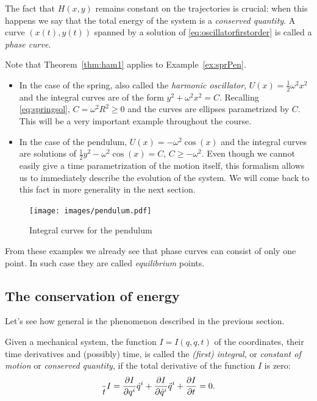 \documentclass[english,fontsize=11pt,paper=a5,oneside]{scrbook}
\let\d\relax
\DeclareMathOperator{\d}{d}
\theoremstyle{definition}
\newenvironment{example}
  {\pushQED{\qed}\renewcommand{\qedsymbol}{$\lozenge$}\examplex}
  {\popQED\endexamplex}
\begin{document}
The fact that $H(x,y)$ remains constant on the trajectories is crucial: when this happens we say that the total energy of the system is a \emph{conserved quantity}.
A curve $(x(t), y(t))$ spanned by a solution of \eqref{eq:oscillatorfirstorder} is called a \emph{phase curve}.

\begin{example}
Note that Theorem~\ref{thm:ham1} applies to Example~\ref{ex:sprPen}.
\begin{itemize}
    \item In the case of the spring, also called the \emph{harmonic oscillator}, $U(x) = \frac12 \omega^2 x^2$ and the integral curves are of the form $y^2 + \omega^2 x^2 = C$.
    Recalling \eqref{eq:springsol}, $C = \omega^2 R^2 \geq 0$ and the curves are ellipses parametrized by $C$. 
    This will be a very important example throughout the course.
    \item In the case of the pendulum, $U(x) = -\omega^2 \cos(x)$ and the integral curves are solutions of $\frac12 y^2 - \omega^2 \cos(x) = C$, $C \geq -\omega^2$.
    Even though we cannot easily give a time parametrization of the motion itself, this formalism allows us to immediately describe the evolution of the system.
    We will come back to this fact in more generality in the next section.
\end{itemize}
\end{example}

\begin{figure}[ht]
    \centering
    \texttt{[image: images/pendulum.pdf]}
    \caption{Integral curves for the pendulum}
    \label{fig:pendulum}
\end{figure}

From these examples we already see that phase curves can consist of only one point. In such case they are called \emph{equilibrium} points.

\subsection{The conservation of energy}\label{sec:energy}

Let's see how general is the phenomenon described in the previous section.

\begin{tcolorbox}
    Given a mechanical system, the function $I = I(q, \dot q, t)$ of the coordinates, their time derivatives and (possibly) time, is called the \emph{(first) integral}, or \emph{constant of motion} or \emph{conserved quantity}, if the total derivative of the function $I$ is zero:
    \begin{equation}\label{eq:firstintegralD}
        \frac{\d}{\d t}I =
            \frac{\partial I}{\partial q^i} \dot q^i + 
            \frac{\partial I}{\partial \dot q^i} \ddot q^i +
            \frac{\partial I}{\partial t}
            = 0.
    \end{equation}
\end{tcolorbox}
\end{document}
